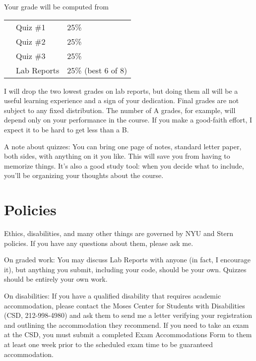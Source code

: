 \documentclass[11pt]{article}
\begin{document}
Your grade will be computed from
\begin{center}
\begin{tabular}{lll}
&Quiz \#1    &   25\% \\
&Quiz \#2    &   25\% \\
&Quiz \#3    &   25\% \\
\hspace*{0.2in}&Lab Reports  \hspace*{0.25in}    &   25\%  (best 6 of 8)
\end{tabular}
\end{center}
I will drop the two lowest grades on lab reports,
but doing them all will be a useful learning experience
and a sign of your dedication.
Final grades are not subject to any fixed distribution.
The number of A grades, for example,
will depend only on your performance in the course.
If you make a good-faith effort,
I expect it to be hard to get less than a B.

A note about quizzes:  You can bring one page of notes, standard letter paper,
both sides, with anything on it you like.
This will save you from having to memorize things.
It's also a good study tool:  when you decide what to include,
you'll be organizing your thoughts about the course.


\section*{Policies}

Ethics, disabilities, and many other things are governed by NYU
and Stern policies.
If you have any questions about them, please ask me.

On graded work:
You may discuss Lab Reports with anyone (in fact, I encourage it),
but anything you submit, including your code, should be your own.
Quizzes should be entirely your own work.

On disabilities:
If you have a qualified disability that requires academic accommodation,
please contact the Moses Center for Students with Disabilities (CSD, 212-998-4980) and ask them to
send me a letter verifying your registration and outlining the accommodation they recommend.
If you need to take an exam at the CSD,
you must submit a completed Exam Accommodations Form to them
at least one week prior to the scheduled exam time to be guaranteed accommodation.
\end{document}
